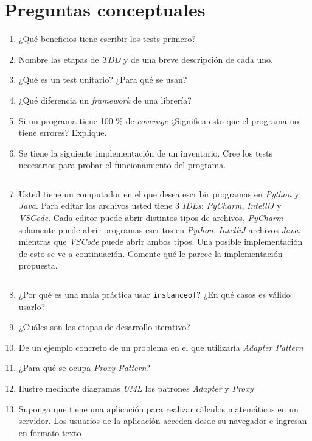 \section{Preguntas conceptuales}
\begin{enumerate}
  
  \item ¿Qué beneficios tiene escribir los tests primero?
  \item Nombre las etapas de \textit{TDD} y de una breve descripción de cada uno.
  \item ¿Qué es un test unitario? ¿Para qué se usan?
  \item ¿Qué diferencia un \textit{framework} de una librería?
  \item Si un programa tiene 100 \% de \textit{coverage} ¿Significa esto que el programa 
    no tiene errores? Explique.
  \item Se tiene la siguiente implementación de un inventario. Cree los tests necesarios 
    para probar el funcionamiento del programa.
    \inputminted{java}{listings/Inventario.java}
  \item Usted tiene un computador en el que desea escribir programas en \textit{Python} y 
    \textit{Java}. Para editar los archivos usted tiene 3 \textit{IDEs}: \textit{PyCharm},
    \textit{IntelliJ} y \textit{VSCode}. Cada editor puede abrir distintos tipos de 
    archivos, \textit{PyCharm} solamente puede abrir programas escritos en 
    \textit{Python}, \textit{IntelliJ} archivos \textit{Java}, mientras que 
    \textit{VSCode} puede abrir ambos tipos. Una posible implementación de esto se ve a 
    continuación. Comente qué le parece la implementación propuesta.
    \inputminted{java}{listings/Archivos.java}
  \item ¿Por qué es una mala práctica usar \texttt{instanceof}? ¿En qué casos es
    válido usarlo?
  \item ¿Cuáles son las etapas de desarrollo iterativo?
  \item De un ejemplo concreto de un problema en el que utilizaría 
    \textit{Adapter Pattern}
  \item ¿Para qué se ocupa \textit{Proxy Pattern}?
  \item Ilustre mediante diagramas \textit{UML} los patrones \textit{Adapter} y 
    \textit{Proxy}
  \item Suponga que tiene una aplicación para realizar cálculos matemáticos en un 
    servidor.
    Los usuarios de la aplicación acceden desde su navegador e ingresan en formato texto

\end{enumerate}
